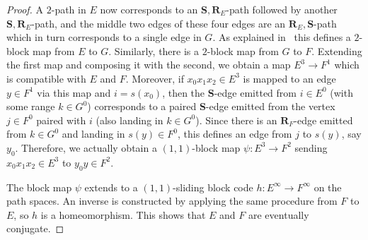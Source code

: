 \documentclass[12pt,a4paper,oneside,reqno,final]{amsart}
\newcommand{\LRA}{\longrightarrow}
\theoremstyle{definition}
\numberwithin{equation}{section} %
\begin{document}
\begin{proof}
    A $2$-path in $E$ now corresponds to an $\textbf{S}, \textbf{R}_E$-path followed by another $\textbf{S}, \textbf{R}_E$-path,
    and the middle two edges of these four edges are an $\textbf{R}_E, \textbf{S}$-path which in turn corresponds to a single edge in $G$.
    As explained in~\cite[Section 7.2]{LM} this defines a $2$-block map from $E$ to $G$.
    Similarly, there is a $2$-block map from $G$ to $F$.
    Extending the first map and composing it with the second, we obtain a map $E^3\LRA F^1$ which is compatible with $E$ and $F$.
    Moreover, if $x_0 x_1 x_2\in E^3$ is mapped to an edge $y\in F^1$ via this map and $i = s(x_0)$, 
    then the \textbf{S}-edge emitted from $i\in E^0$ (with some range $k\in G^0$) corresponds to a paired \textbf{S}-edge emitted from the vertex $j\in F^0$ paired with $i$ (also landing in $k\in G^0$).
    Since there is an $\textbf{R}_F$-edge emitted from $k\in G^0$ and landing in $s(y)\in F^0$, this defines an edge from $j$ to $s(y)$, say $y_0$.
    Therefore, we actually obtain a $(1,1)$-block map $\psi\colon E^3\LRA F^2$ sending $x_0 x_1 x_2\in E^3$ to $y_0 y\in F^2$.

    The block map $\psi$ extends to a $(1,1)$-sliding block code $h\colon E^\infty\LRA F^\infty$ on the path spaces.
    An inverse is constructed by applying the same procedure from $F$ to $E$, so $h$ is a homeomorphism.
    This shows that $E$ and $F$ are eventually conjugate.
\end{proof}
\end{document}
